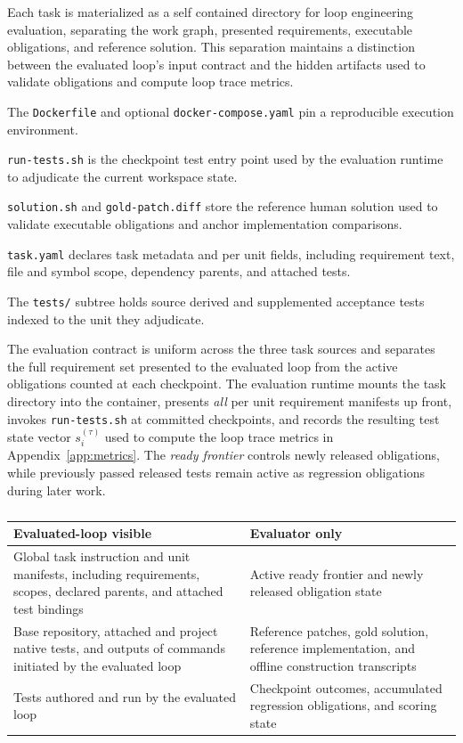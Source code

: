 Each task is materialized as a self contained directory for loop engineering evaluation, separating the work graph, presented requirements, executable obligations, and reference solution. This separation maintains a distinction between the evaluated loop's input contract and the hidden artifacts used to validate obligations and compute loop trace metrics.

The \texttt{Dockerfile} and optional \texttt{docker-compose.yaml} pin a reproducible execution environment.

\texttt{run-tests.sh} is the checkpoint test entry point used by the evaluation runtime to adjudicate the current workspace state.

\texttt{solution.sh} and \texttt{gold-patch.diff} store the reference human solution used to validate executable obligations and anchor implementation comparisons.

\texttt{task.yaml} declares task metadata and per unit fields, including requirement text, file and symbol scope, dependency parents, and attached tests.

The \texttt{tests/} subtree holds source derived and supplemented acceptance tests indexed to the unit they adjudicate.

The evaluation contract is uniform across the three task sources and separates the full requirement set presented to the evaluated loop from the active obligations counted at each checkpoint. The evaluation runtime mounts the task directory into the container, presents \emph{all} per unit requirement manifests up front, invokes \texttt{run-tests.sh} at committed checkpoints, and records the resulting test state vector $s_i^{(\tau)}$ used to compute the loop trace metrics in Appendix~\ref{app:metrics}. The \emph{ready frontier} controls newly released obligations, while previously passed released tests remain active as regression obligations during later work.

\begin{table}[t]
  \centering
  \caption{}
  \label{tab:visibility-contract}
  \small
  \setlength{\tabcolsep}{5pt}
  \renewcommand{\arraystretch}{1.12}
  \begin{tabularx}{\linewidth}{@{}>{\raggedright\arraybackslash}X >{\raggedright\arraybackslash}X@{}}
    \toprule
    \textbf{Evaluated-loop visible} & \textbf{Evaluator only} \\
    \midrule
    Global task instruction and unit manifests, including requirements, scopes, declared parents, and attached test bindings & Active ready frontier and newly released obligation state \\
    Base repository, attached and project native tests, and outputs of commands initiated by the evaluated loop & Reference patches, gold solution, reference implementation, and offline construction transcripts \\
    Tests authored and run by the evaluated loop & Checkpoint outcomes, accumulated regression obligations, and scoring state \\
    \bottomrule
  \end{tabularx}
\end{table}
